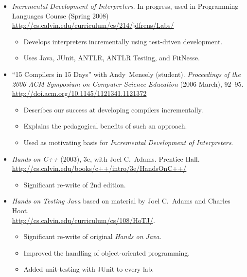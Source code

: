 \documentclass[letterpaper,11pt]{article}
\newcommand{\duphref}[1]{\href{#1}{#1}}
\begin{document}
\begin{itemize}
	\item \textit{Incremental Development of Interpreters}.  In progress, used in Programming Languages Course (Spring 2008) \\\duphref{http://cs.calvin.edu/curriculum/cs/214/jdfrens/Labs/}
	  \begin{itemize}
	  	\item Develops interpreters incrementally using test-driven development.
			\item Uses Java, JUnit, ANTLR, ANTLR Testing, and FitNesse.
	  \end{itemize}
	
	\item ``15 Compilers in 15 Days'' with Andy~Meneely (student).  \textit{Proceedings of the 2006 ACM Symposium on Computer Science Education} (2006 March), 92--95. \\\duphref{http://doi.acm.org/10.1145/1121341.1121372}
	  \begin{itemize}
		\item Describes our success at developing compilers incrementally.
		\item Explains the pedagogical benefits of such an approach.
		\item Used as motivating basis for \textit{Incremental Development of Interpreters}.
  	\end{itemize}
	
	\item \textit{Hands on C++} (2003), 3e, with Joel C.\ Adams.  Prentice Hall.   \\\duphref{http://cs.calvin.edu/books/c++/intro/3e/HandsOnC++/}
	  \begin{itemize}
	  	\item Significant re-write of 2nd edition.
	  \end{itemize}
	  
	\item \textit{Hands on Testing Java} based on material by Joel C.\ Adams and Charles Hoot.  \\\duphref{http://cs.calvin.edu/curriculum/cs/108/HoTJ/}.
	  \begin{itemize}
	  	\item Significant re-write of original \textit{Hands on Java}.
			\item Improved the handling of object-oriented programming.
			\item Added unit-testing with JUnit to every lab.
	  \end{itemize}
  
\end{itemize}
\end{document}

